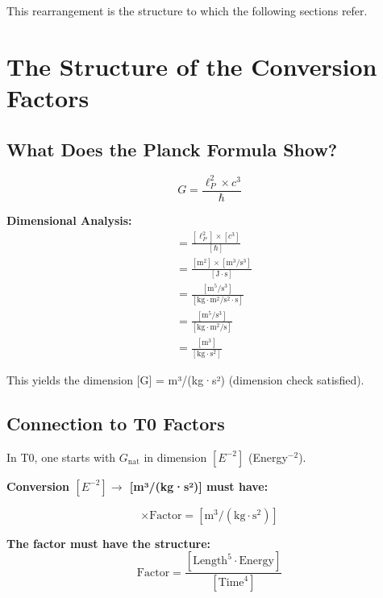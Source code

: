 	This rearrangement is the structure to which the following sections refer.
	
	\section{The Structure of the Conversion Factors}
	
	\subsection{What Does the Planck Formula Show?}
	
	\begin{formula}
		\begin{equation}
			\boxed{G = \frac{\ell_P^2 \times c^3}{\hbar}}
		\end{equation}
		
		\textbf{Dimensional Analysis:}
		\begin{align}
			[G] &= \frac{[\ell_P^2] \times [c^3]}{[\hbar]} \\
			&= \frac{[\text{m}^2] \times [\text{m}^3/\text{s}^3]}{[\text{J} \cdot \text{s}]} \\
			&= \frac{[\text{m}^5/\text{s}^3]}{[\text{kg} \cdot \text{m}^2/\text{s}^2 \cdot \text{s}]} \\
			&= \frac{[\text{m}^5/\text{s}^3]}{[\text{kg} \cdot \text{m}^2/\text{s}]} \\
			&= \frac{[\text{m}^3]}{[\text{kg} \cdot \text{s}^2]}
		\end{align}
		
		This yields the dimension [G] = m³/(kg·s²) (dimension check satisfied).
	\end{formula}
	
	\subsection{Connection to T0 Factors}
	
	In T0, one starts with $G_{\text{nat}}$ in dimension $[E^{-2}]$ (Energy$^{-2}$).
	
	\textbf{Conversion $[E^{-2}] \to$ [m³/(kg·s²)] must have:}
	
	\begin{equation}
		[E^{-2}] \times \text{Factor} = [\text{m}^3/(\text{kg} \cdot \text{s}^2)]
	\end{equation}
	
	\textbf{The factor must have the structure:}
	\begin{equation}
		\text{Factor} = \frac{[\text{Length}^5 \cdot \text{Energy}]}{[\text{Time}^4]}
	\end{equation}

